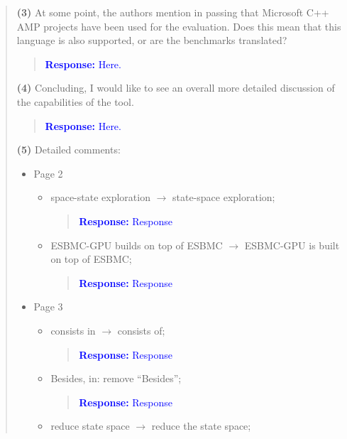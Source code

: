 \documentclass[11pt]{article}
\begin{document}
\begin{quote}
{\bf (3)} At some point, the authors mention in passing that Microsoft C++ AMP projects have been used for the evaluation. Does this mean that this language is also supported, or are the benchmarks translated?

\begin{quote}
\textcolor{blue}{\textbf{Response:} Here.}
\end{quote}

{\bf (4)} Concluding, I would like to see an overall more detailed discussion of the capabilities of the tool.

\begin{quote}
\textcolor{blue}{\textbf{Response:} Here.}
\end{quote}

{\bf (5)} Detailed comments:
\begin{itemize}
\item Page 2
  \begin{itemize}
  \item space-state exploration $\rightarrow$ state-space exploration;
  
    \begin{quote}
    \textcolor{blue}{\textbf{Response:} Response}
    \end{quote}

  \item ESBMC-GPU builds on top of ESBMC $\rightarrow$ ESBMC-GPU is built on top of ESBMC;
  
    \begin{quote}
    \textcolor{blue}{\textbf{Response:} Response}
    \end{quote}

  \end{itemize}
\item Page 3
  \begin{itemize}
  \item consists in $\rightarrow$ consists of;
  
    \begin{quote}
    \textcolor{blue}{\textbf{Response:} Response}
    \end{quote}

  \item Besides, in: remove ``Besides'';
  
    \begin{quote}
    \textcolor{blue}{\textbf{Response:} Response}
    \end{quote}

  \item reduce state space $\rightarrow$ reduce the state space;
  

\end{itemize}
\end{itemize}
\end{quote}
\end{document}
